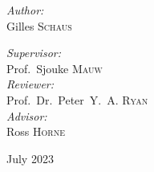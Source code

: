 \begin{titlepage}
\begin{center}
\vspace{4cm}
\begin{minipage}[t]{0.4\textwidth}
\begin{flushleft} \large
\emph{Author:}\\
Gilles \textsc{Schaus}
\end{flushleft}
\end{minipage}
\begin{minipage}[t]{0.4\textwidth}
\begin{flushright} \large
\emph{Supervisor:} \\
Prof.~Sjouke \textsc{Mauw} \\
\vspace{.5em}
\emph{Reviewer:} \\
Prof.~Dr.~Peter~Y.~A. \textsc{Ryan} \\
\vspace{.5em}
\emph{Advisor:} \\
Ross \textsc{Horne}
\end{flushright}
\end{minipage}

\vfill

{\large July 2023}

\end{center}

\end{titlepage}